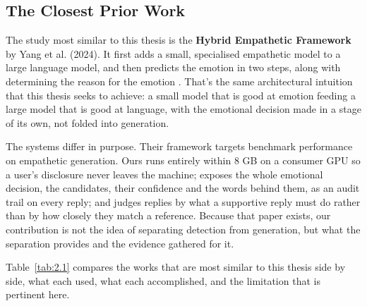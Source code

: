 \subsection{The Closest Prior Work}
\label{sec:2.2.7}

The study most similar to this thesis is the \textbf{Hybrid Empathetic Framework} by Yang et al. (2024). It first adds a small, specialised empathetic model to a large language model, and then predicts the emotion in two steps, along with determining the reason for the emotion \cite{yang2024hef}. That's the same architectural intuition that this thesis seeks to achieve: a small model that is good at emotion feeding a large model that is good at language, with the emotional decision made in a stage of its own, not folded into generation.

The systems differ in purpose. Their framework targets benchmark performance on empathetic generation. Ours runs entirely within 8 GB on a consumer GPU so a user's disclosure never leaves the machine; exposes the whole emotional decision, the candidates, their confidence and the words behind them, as an audit trail on every reply; and judges replies by what a supportive reply must do rather than by how closely they match a reference. Because that paper exists, our contribution is not the idea of separating detection from generation, but what the separation provides and the evidence gathered for it.

Table~\ref{tab:2.1} compares the works that are most similar to this thesis side by side, what each used, what each accomplished, and the limitation that is pertinent here.

